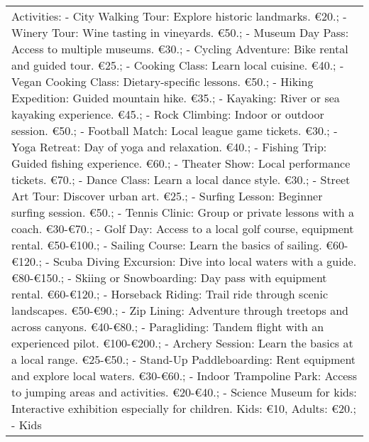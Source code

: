 \begin{table*}[!ht]
{\begin{tabular}{p{}}
Activities:     \newline - City Walking Tour: Explore historic landmarks. €20.;    \newline - Winery Tour: Wine tasting in vineyards. €50.;    \newline - Museum Day Pass: Access to multiple museums. €30.;    \newline - Cycling Adventure: Bike rental and guided tour. €25.;    \newline - Cooking Class: Learn local cuisine. €40.;    \newline - Vegan Cooking Class: Dietary-specific lessons. €50.;    \newline - Hiking Expedition: Guided mountain hike. €35.;    \newline - Kayaking: River or sea kayaking experience. €45.;    \newline - Rock Climbing: Indoor or outdoor session. €50.;    \newline - Football Match: Local league game tickets. €30.;    \newline - Yoga Retreat: Day of yoga and relaxation. €40.;    \newline - Fishing Trip: Guided fishing experience. €60.;    \newline - Theater Show: Local performance tickets. €70.;    \newline - Dance Class: Learn a local dance style. €30.;    \newline - Street Art Tour: Discover urban art. €25.;    \newline - Surfing Lesson: Beginner surfing session. €50.;    \newline - Tennis Clinic: Group or private lessons with a coach. €30-€70.;    \newline - Golf Day: Access to a local golf course, equipment rental. €50-€100.;    \newline - Sailing Course: Learn the basics of sailing. €60-€120.;    \newline - Scuba Diving Excursion: Dive into local waters with a guide. €80-€150.;    \newline - Skiing or Snowboarding: Day pass with equipment rental. €60-€120.;    \newline - Horseback Riding: Trail ride through scenic landscapes. €50-€90.;    \newline - Zip Lining: Adventure through treetops and across canyons. €40-€80.;    \newline - Paragliding: Tandem flight with an experienced pilot. €100-€200.;    \newline - Archery Session: Learn the basics at a local range. €25-€50.;    \newline - Stand-Up Paddleboarding: Rent equipment and explore local waters. €30-€60.;    \newline - Indoor Trampoline Park: Access to jumping areas and activities. €20-€40.;    \newline - Science Museum for kids: Interactive exhibition especially for children. Kids: €10, Adults: €20.;    \newline - Kids 
\end{tabular}}
\end{table*}
